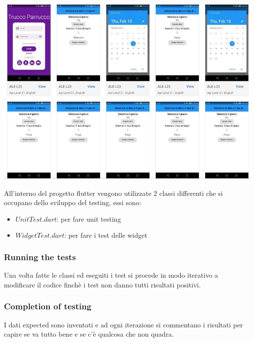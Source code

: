 \documentclass{article}
\begin{document}
\\\includegraphics[scale = 0.50]{Immagini/firebaseTesting.jpg}

All'interno del progetto flutter vengono utilizzate 2 classi differenti che si occupano dello 
sviluppo del testing, essi sono:
\begin{itemize}
    \item $UnitTest.dart$: per fare unit testing
    \item $WidgetTest.dart$: per fare i test delle widget
\end{itemize}

\subsubsection{Running the tests}
Una volta fatte le classi ed eseguiti i test si procede in modo iterativo a modificare il codice
finchè i test non danno tutti risultati positivi. 

\subsubsection{Completion of testing}
I dati expected sono inventati e ad ogni iterazione si commentano i risultati per capire 
se va tutto bene e se c'è qualcosa che non quadra.

\newpage
\end{document}
